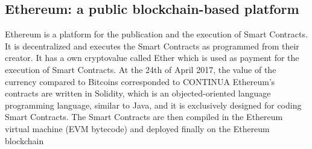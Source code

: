 






\subsection{Ethereum: a public blockchain-based platform}
Ethereum is a platform for the publication and the execution of Smart Contracts. It is decentralized \cite{paper2} and executes the Smart Contracts as programmed from their creator.
It has a own cryptovalue called Ether which is used as payment for the execution of Smart Contracts.
At the 24th of April 2017, the value of the currency compared to Bitcoins corresponded to CONTINUA
Ethereum's contracts are written in Solidity, which is an objected-oriented language programming language, similar to Java, and it is exclusively designed for coding Smart Contracts.
The Smart Contracts are then compiled in the Ethereum virtual machine (EVM bytecode) and deployed finally on the Ethereum blockchain 

